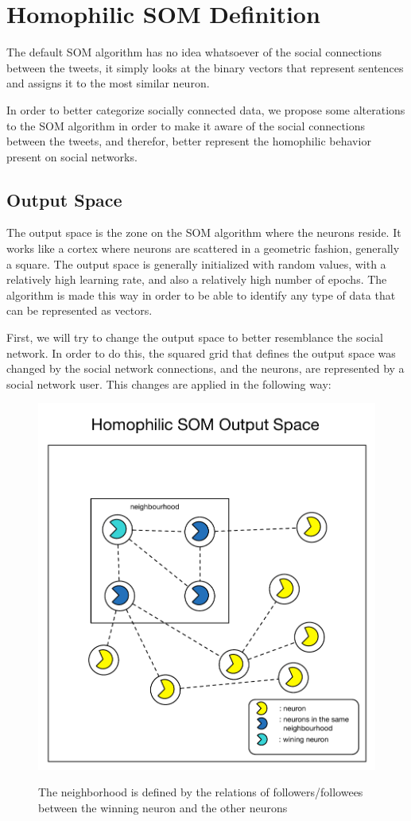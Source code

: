 \documentclass[journal]{IEEEtran}
\begin{document}
\section{Homophilic SOM Definition}
\label{sec:algorithm_changes}
The default \ac{SOM} algorithm has no idea whatsoever of the social connections between the tweets, it simply looks at the binary vectors that represent sentences and assigns it to the most similar neuron.

In order to better categorize socially connected data, we propose some alterations to the \ac{SOM} algorithm in order to make it aware of the social connections between the tweets, and therefor, better represent the homophilic behavior present on social networks.

\subsection{Output Space}
\label{sub:output_space}
The output space is the zone on the \ac{SOM} algorithm where the neurons reside. It works like a cortex where neurons are scattered in a geometric fashion, generally a square. The output space is generally initialized with random values, with a relatively high learning rate, and also a relatively high number of epochs. The algorithm is made this way in order to be able to identify any type of data that can be represented as vectors.

First, we will try to change the output space to better resemblance the social network. In order to do this, the squared grid that defines the output space was changed by the social network connections, and the neurons, are represented by a social network user. This changes are applied in the following way:

\begin{figure}[h]
  \centering
  \includegraphics[width=0.6\linewidth]{./images/homophilic_outputspace.pdf}
  \label{chp3:homout}
  \caption{ The neighborhood is defined by the relations of followers/followees between the winning neuron and the other neurons }
\end{figure}
\end{document}
